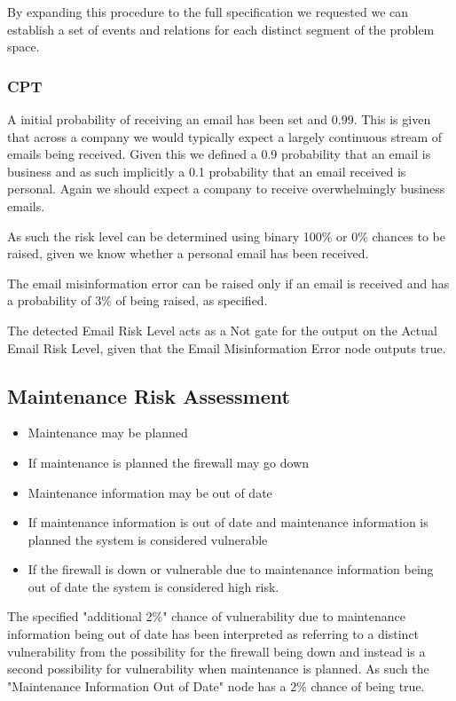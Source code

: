 \documentclass[10pt,a4paper]{article}
\begin{document}
By expanding this procedure to the full specification we requested we can establish a set of events and relations for each distinct segment of the problem space.

\subsubsection{CPT}

A initial probability of receiving an email has been set and 0.99. This is given that across a company we would typically expect a largely continuous stream of emails being received. Given this we defined a 0.9 probability that an email is business and as such implicitly a 0.1 probability that an email received is personal. Again we should expect a company to receive overwhelmingly business emails.

As such the risk level can be determined using binary 100\% or 0\% chances to be raised, given we know whether a personal email has been received. 

The email misinformation error can be raised only if an email is received and has a probability of 3\% of being raised, as specified.

The detected Email Risk Level acts as a Not gate for the output on the Actual Email Risk Level, given that the Email Misinformation Error node outputs true.

\subsection{Maintenance Risk Assessment}

\begin{itemize}
\item Maintenance may be planned
\item If maintenance is planned the firewall may go down
\item Maintenance information may be out of date
\item If maintenance information is out of date and maintenance information is planned the system is considered vulnerable
\item If the firewall is down or vulnerable due to maintenance information being out of date the system is considered high risk.
\end{itemize}

The specified "additional 2\%" chance of vulnerability due to maintenance information being out of date has been interpreted as referring to a distinct vulnerability from the possibility for the firewall being down and instead is a second possibility for vulnerability when maintenance is planned. As such the "Maintenance Information Out of Date" node has a 2\% chance of being true.
\end{document}
